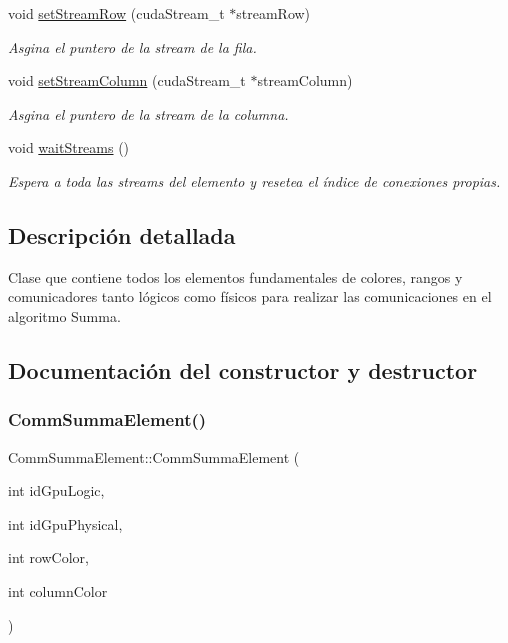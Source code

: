 \begin{DoxyCompactItemize}
void \hyperlink{classCommSummaElement_a098bfdc0e37966989b9291dec82a3271}{set\+Stream\+Row} (cuda\+Stream\+\_\+t $\ast$stream\+Row)
\begin{DoxyCompactList}\small\item\em Asgina el puntero de la stream de la fila. \end{DoxyCompactList}\item 
void \hyperlink{classCommSummaElement_a388514818c690e6ac003d1bfa31d74b3}{set\+Stream\+Column} (cuda\+Stream\+\_\+t $\ast$stream\+Column)
\begin{DoxyCompactList}\small\item\em Asgina el puntero de la stream de la columna. \end{DoxyCompactList}\item 
\mbox{\label{classCommSummaElement_a202a0d1031ccf9c4b8800fd987d9750e}} 
void \hyperlink{classCommSummaElement_a202a0d1031ccf9c4b8800fd987d9750e}{wait\+Streams} ()
\begin{DoxyCompactList}\small\item\em Espera a toda las streams del elemento y resetea el índice de conexiones propias. \end{DoxyCompactList}\end{DoxyCompactItemize}


\subsection{Descripción detallada}
Clase que contiene todos los elementos fundamentales de colores, rangos y comunicadores tanto lógicos como físicos para realizar las comunicaciones en el algoritmo Summa. 

\subsection{Documentación del constructor y destructor}
\mbox{\label{classCommSummaElement_ace51fafb58d6b18fc54cedb3a30e5bbb}} 
\subsubsection{\texorpdfstring{Comm\+Summa\+Element()}{CommSummaElement()}}
{\footnotesize\ttfamily Comm\+Summa\+Element\+::\+Comm\+Summa\+Element (\begin{DoxyParamCaption}\item[{int}]{id\+Gpu\+Logic,  }\item[{int}]{id\+Gpu\+Physical,  }\item[{int}]{row\+Color,  }\item[{int}]{column\+Color }\end{DoxyParamCaption})}



